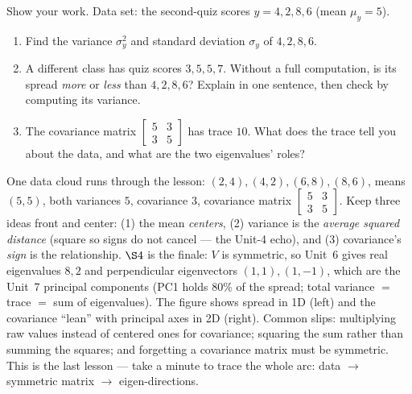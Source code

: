 \documentclass[10pt]{article}
\begin{document}
\begin{practicebox}
Show your work. Data set: the second-quiz scores $y=4,2,8,6$ (mean $\mu_y=5$).
\begin{enumerate}[leftmargin=1.6em, itemsep=4pt]
  \item Find the variance $\sigma_y^2$ and standard deviation $\sigma_y$ of $4,2,8,6$. 
  \item A different class has quiz scores $3,5,5,7$. Without a full computation, is its spread \emph{more} or \emph{less} than $4,2,8,6$? Explain in one sentence, then check by computing its variance. 
  \item The covariance matrix $\left[\begin{smallmatrix}5&3\\3&5\end{smallmatrix}\right]$ has trace $10$. What does the trace tell you about the data, and what are the two eigenvalues' roles? 
\end{enumerate}
\end{practicebox}

\begin{teachernote}
One data cloud runs through the lesson: $(2,4),(4,2),(6,8),(8,6)$, means $(5,5)$, both variances $5$, covariance
$3$, covariance matrix $\left[\begin{smallmatrix}5&3\\3&5\end{smallmatrix}\right]$. Keep three ideas front and
center: (1) the mean \emph{centers}, (2) variance is the \emph{average squared distance} (square so signs do not
cancel --- the Unit-4 echo), and (3) covariance's \emph{sign} is the relationship. $\S4$ is the finale: $V$ is
symmetric, so Unit~6 gives real eigenvalues $8,2$ and perpendicular eigenvectors $(1,1),(1,-1)$, which are the
Unit~7 principal components (PC1 holds $80\%$ of the spread; total variance $=$ trace $=$ sum of eigenvalues).
The figure shows spread in 1D (left) and the covariance ``lean'' with principal axes in 2D (right). Common slips:
multiplying raw values instead of centered ones for covariance; squaring the sum rather than summing the squares;
and forgetting a covariance matrix must be symmetric. This is the last lesson --- take a minute to trace the
whole arc: data $\to$ symmetric matrix $\to$ eigen-directions.
\end{teachernote}
\end{document}
